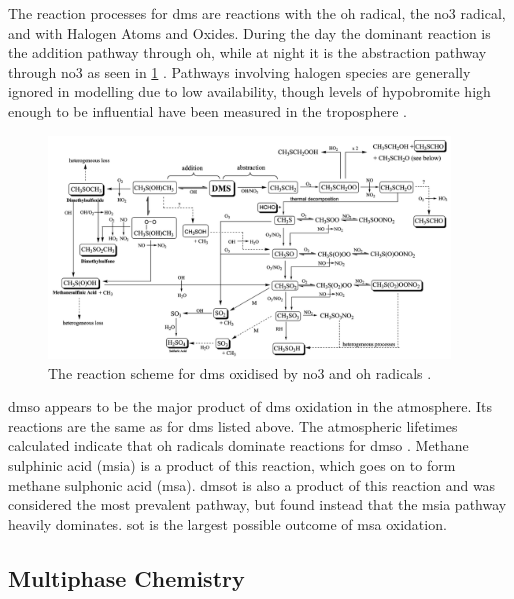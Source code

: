 	The reaction processes for \gls{dms} are reactions with the \gls{oh} radical, the \gls{no3} radical, and with Halogen Atoms and Oxides.  During the day the dominant reaction is the addition pathway through \gls{oh}, while at night it is the abstraction pathway through \gls{no3} as seen in \cref{fig:dmspath} \citep{barnes:2006ug}. Pathways involving halogen species are generally ignored in modelling due to low availability, though levels of hypobromite high enough to be influential have been measured in the troposphere \citep{platt2003role}.

	\begin{figure}[!htb]
	 	\centering
	    \includegraphics[width=0.95\textwidth,natwidth=1924,natheight=1068]{Fig/dms_Pathway.png}
	    \caption{The reaction scheme for \gls{dms} oxidised by \gls{no3} and \gls{oh} radicals \citep{barnes:2006ug}.}
	    \label{fig:dmspath}
	\end{figure}

	\gls{dmso} appears to be the major product of \gls{dms} oxidation in the atmosphere. Its reactions are the same as for \gls{dms} listed above. The atmospheric lifetimes calculated indicate that \gls{oh} radicals dominate reactions for \gls{dmso} \citep{barnes:2006ug}. Methane sulphinic acid (\gls{msia}) is a product of this reaction, which goes on to form methane sulphonic acid (\gls{msa}). \gls{dmsot} is also a product of this reaction and was considered the most prevalent pathway, but \citet{barnes:2006ug} found instead that the \gls{msia} pathway heavily dominates. \gls{sot} is the largest possible outcome of \gls{msa} oxidation.

	\subsection{Multiphase Chemistry}
	\label{subsec:multchem}

